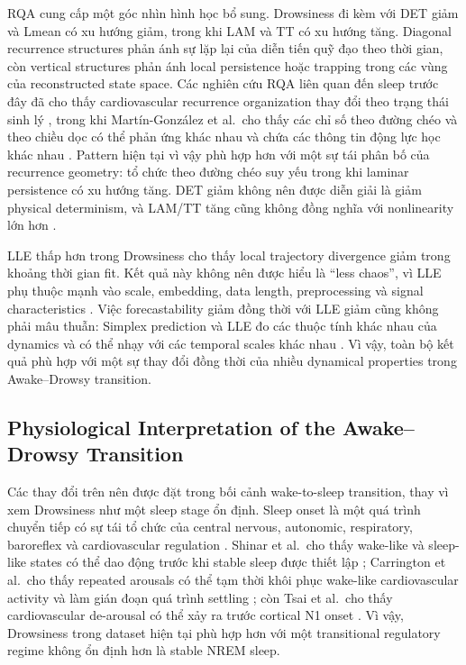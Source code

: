 RQA cung cấp một góc nhìn hình học bổ sung. Drowsiness đi kèm với DET giảm và Lmean có xu hướng giảm, trong khi LAM và TT có xu hướng tăng. Diagonal recurrence structures phản ánh sự lặp lại của diễn tiến quỹ đạo theo thời gian, còn vertical structures phản ánh local persistence hoặc trapping trong các vùng của reconstructed state space. Các nghiên cứu RQA liên quan đến sleep trước đây đã cho thấy cardiovascular recurrence organization thay đổi theo trạng thái sinh lý \cite{rolink2015}, trong khi Martín-González et al.\ cho thấy các chỉ số theo đường chéo và theo chiều dọc có thể phản ứng khác nhau và chứa các thông tin động lực học khác nhau \cite{martingonzalez2018}. Pattern hiện tại vì vậy phù hợp hơn với một sự tái phân bố của recurrence geometry: tổ chức theo đường chéo suy yếu trong khi laminar persistence có xu hướng tăng. DET giảm không nên được diễn giải là giảm physical determinism, và LAM/TT tăng cũng không đồng nghĩa với nonlinearity lớn hơn \cite{calderonjuarez2023}.

LLE thấp hơn trong Drowsiness cho thấy local trajectory divergence giảm trong khoảng thời gian fit. Kết quả này không nên được hiểu là ``less chaos'', vì LLE phụ thuộc mạnh vào scale, embedding, data length, preprocessing và signal characteristics \cite{yeragani2004,hu2009}. Việc forecastability giảm đồng thời với LLE giảm cũng không phải mâu thuẫn: Simplex prediction và LLE đo các thuộc tính khác nhau của dynamics và có thể nhạy với các temporal scales khác nhau \cite{porta2015,faes2016,hu2009}. Vì vậy, toàn bộ kết quả phù hợp với một sự thay đổi đồng thời của nhiều dynamical properties trong Awake--Drowsy transition.

\subsection{Physiological Interpretation of the Awake--Drowsy Transition}

Các thay đổi trên nên được đặt trong bối cảnh wake-to-sleep transition, thay vì xem Drowsiness như một sleep stage ổn định. Sleep onset là một quá trình chuyển tiếp có sự tái tổ chức của central nervous, autonomic, respiratory, baroreflex và cardiovascular regulation \cite{dezambotti2018,tobaldini2013}. Shinar et al.\ cho thấy wake-like và sleep-like states có thể dao động trước khi stable sleep được thiết lập \cite{shinar2006}; Carrington et al.\ cho thấy repeated arousals có thể tạm thời khôi phục wake-like cardiovascular activity và làm gián đoạn quá trình settling \cite{carrington2005}; còn Tsai et al.\ cho thấy cardiovascular de-arousal có thể xảy ra trước cortical N1 onset \cite{tsai2019}. Vì vậy, Drowsiness trong dataset hiện tại phù hợp hơn với một transitional regulatory regime không ổn định hơn là stable NREM sleep.


